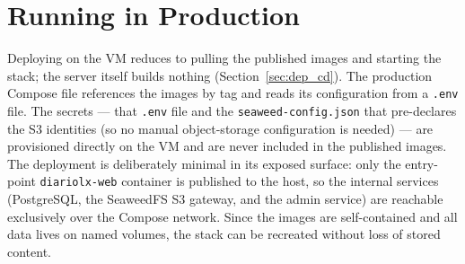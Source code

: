 \section{Running in Production} \label{sec:dep_run}

Deploying on the VM reduces to pulling the published images and starting the stack; the
server itself builds nothing (Section~\ref{sec:dep_cd}). The production Compose
file references the images by tag and reads its configuration from a \texttt{.env} file.
The secrets --- that \texttt{.env} file and the \texttt{seaweed-config.json} that
pre-declares the S3 identities (so no manual object-storage configuration is needed) ---
are provisioned directly on the VM and are never included in the published images. The
deployment is deliberately minimal in its exposed surface: only the entry-point
\texttt{diariolx-web} container is published to the host, so the internal services
(PostgreSQL, the SeaweedFS S3 gateway,
and the admin service) are reachable exclusively over the Compose network. Since the
images are self-contained and all data lives on named volumes, the stack can be
recreated without loss of stored content.
